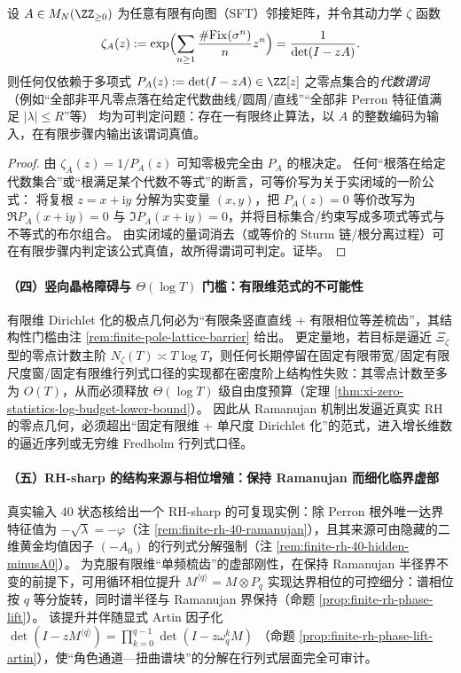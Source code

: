 \begin{proposition}\label{prop:xi-finite-kernel-zeta-rational-decidability}
设 \(A\in M_N(\ZZ_{\ge 0})\) 为任意有限有向图（SFT）邻接矩阵，并令其动力学 \(\zeta\) 函数
\[
\zeta_A(z):=\exp\Bigl(\sum_{n\ge 1}\frac{\#\mathrm{Fix}(\sigma^n)}{n}z^n\Bigr)
=\frac{1}{\det(I-zA)}.
\]
则任何仅依赖于多项式 \(P_A(z):=\det(I-zA)\in\ZZ[z]\) 之零点集合的\emph{代数谓词}
（例如“全部非平凡零点落在给定代数曲线/圆周/直线”“全部非 Perron 特征值满足 \(|\lambda|\le R\)”等）
均为可判定问题：存在一有限终止算法，以 \(A\) 的整数编码为输入，在有限步骤内输出该谓词真值。
\end{proposition}
\begin{proof}
由 \(\zeta_A(z)=1/P_A(z)\) 可知零极完全由 \(P_A\) 的根决定。
任何“根落在给定代数集合”或“根满足某个代数不等式”的断言，可等价写为关于实闭域的一阶公式：
将复根 \(z=x+\mathrm{i}y\) 分解为实变量 \((x,y)\)，把 \(P_A(z)=0\) 等价改写为
\(
\Re P_A(x+\mathrm{i}y)=0
\) 与
\(
\Im P_A(x+\mathrm{i}y)=0
\)，并将目标集合/约束写成多项式等式与不等式的布尔组合。
由实闭域的量词消去（或等价的 Sturm 链/根分离过程）可在有限步骤内判定该公式真值，故所得谓词可判定。证毕。
\end{proof}

\paragraph{（四）竖向晶格障碍与 \texorpdfstring{$\Theta(\log T)$}{Theta(log T)} 门槛：有限维范式的不可能性}
有限维 Dirichlet 化的极点几何必为“有限条竖直直线 + 有限相位等差梳齿”，其结构性门槛由注 \ref{rem:finite-pole-lattice-barrier} 给出。
更定量地，若目标是逼近 \(\Xi_{\zeta}\) 型的零点计数主阶 \(N_{\zeta}(T)\asymp T\log T\)，则任何长期停留在固定有限带宽/固定有限尺度窗/固定有限维行列式口径的实现都在密度阶上结构性失败：其零点计数至多为 \(O(T)\)，从而必须释放 \(\Theta(\log T)\) 级自由度预算（定理 \ref{thm:xi-zero-statistics-log-budget-lower-bound}）。
因此从 Ramanujan 机制出发逼近真实 RH 的零点几何，必须超出“固定有限维 + 单尺度 Dirichlet 化”的范式，进入增长维数的逼近序列或无穷维 Fredholm 行列式口径。

\paragraph{（五）RH-sharp 的结构来源与相位增殖：保持 Ramanujan 而细化临界虚部}
真实输入 \(40\) 状态核给出一个 RH-sharp 的可复现实例：除 Perron 根外唯一达界特征值为 \(-\sqrt{\lambda}=-\varphi\)（注 \ref{rem:finite-rh-40-ramanujan}），且其来源可由隐藏的二维黄金均值因子 \((-A_0)\) 的行列式分解强制（注 \ref{rem:finite-rh-40-hidden-minusA0}）。
为克服有限维“单频梳齿”的虚部刚性，在保持 Ramanujan 半径界不变的前提下，可用循环相位提升
\(
M^{\langle q\rangle}=M\otimes P_q
\)
实现达界相位的可控细分：谱相位按 \(q\) 等分旋转，同时谱半径与 Ramanujan 界保持（命题 \ref{prop:finite-rh-phase-lift}）。
该提升并伴随显式 Artin 因子化
\(
\det(I-zM^{\langle q\rangle})=\prod_{k=0}^{q-1}\det(I-z\omega_q^k M)
\)
（命题 \ref{prop:finite-rh-phase-lift-artin}），使“角色通道—扭曲谱块”的分解在行列式层面完全可审计。


